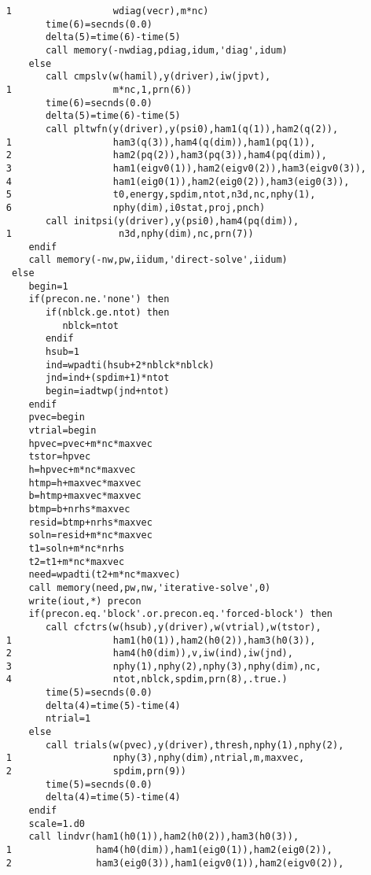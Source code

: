 \documentclass{article}
\begin{document}
\begin{verbatim}
     1                  wdiag(vecr),m*nc)
            time(6)=secnds(0.0)
            delta(5)=time(6)-time(5)
            call memory(-nwdiag,pdiag,idum,'diag',idum)
         else
            call cmpslv(w(hamil),y(driver),iw(jpvt),
     1                  m*nc,1,prn(6))
            time(6)=secnds(0.0)
            delta(5)=time(6)-time(5)
            call pltwfn(y(driver),y(psi0),ham1(q(1)),ham2(q(2)),
     1                  ham3(q(3)),ham4(q(dim)),ham1(pq(1)),
     2                  ham2(pq(2)),ham3(pq(3)),ham4(pq(dim)),
     3                  ham1(eigv0(1)),ham2(eigv0(2)),ham3(eigv0(3)),
     4                  ham1(eig0(1)),ham2(eig0(2)),ham3(eig0(3)),
     5                  t0,energy,spdim,ntot,n3d,nc,nphy(1),
     6                  nphy(dim),i0stat,proj,pnch)
            call initpsi(y(driver),y(psi0),ham4(pq(dim)),
     1                   n3d,nphy(dim),nc,prn(7))
         endif
         call memory(-nw,pw,iidum,'direct-solve',iidum)
      else
         begin=1
         if(precon.ne.'none') then
            if(nblck.ge.ntot) then
               nblck=ntot
            endif
            hsub=1
            ind=wpadti(hsub+2*nblck*nblck)
            jnd=ind+(spdim+1)*ntot
            begin=iadtwp(jnd+ntot)
         endif
         pvec=begin
         vtrial=begin
         hpvec=pvec+m*nc*maxvec
         tstor=hpvec
         h=hpvec+m*nc*maxvec
         htmp=h+maxvec*maxvec
         b=htmp+maxvec*maxvec
         btmp=b+nrhs*maxvec
         resid=btmp+nrhs*maxvec
         soln=resid+m*nc*maxvec
         t1=soln+m*nc*nrhs
         t2=t1+m*nc*maxvec
         need=wpadti(t2+m*nc*maxvec)
         call memory(need,pw,nw,'iterative-solve',0)
         write(iout,*) precon
         if(precon.eq.'block'.or.precon.eq.'forced-block') then
            call cfctrs(w(hsub),y(driver),w(vtrial),w(tstor),
     1                  ham1(h0(1)),ham2(h0(2)),ham3(h0(3)),
     2                  ham4(h0(dim)),v,iw(ind),iw(jnd),
     3                  nphy(1),nphy(2),nphy(3),nphy(dim),nc,
     4                  ntot,nblck,spdim,prn(8),.true.)
            time(5)=secnds(0.0)
            delta(4)=time(5)-time(4)
            ntrial=1 
         else
            call trials(w(pvec),y(driver),thresh,nphy(1),nphy(2),
     1                  nphy(3),nphy(dim),ntrial,m,maxvec,
     2                  spdim,prn(9))
            time(5)=secnds(0.0)
            delta(4)=time(5)-time(4)
         endif
         scale=1.d0
         call lindvr(ham1(h0(1)),ham2(h0(2)),ham3(h0(3)),
     1               ham4(h0(dim)),ham1(eig0(1)),ham2(eig0(2)),
     2               ham3(eig0(3)),ham1(eigv0(1)),ham2(eigv0(2)),

\end{verbatim}
\end{document}

